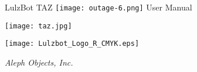 %
%
%
%
%

\date {}
\thispagestyle{empty}
\begingroup
\centering 

\begin{center}
\fontsize{24pt}{1em}\selectfont LulzBot TAZ
\texttt{[image: outage-6.png]}
\fontsize{24pt}{1em}\selectfont User Manual
\end{center}

\par




\texttt{[image: taz.jpg]}


\begin{center}
\texttt{[image: Lulzbot\_Logo\_R\_CMYK.eps]}

{\large \itshape Aleph Objects, Inc.}
\end{center}
\endgroup
